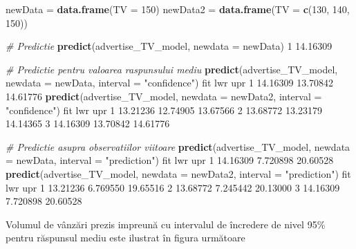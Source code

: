 \documentclass[]{article}
\newenvironment{Shaded}{\begin{snugshade}}{\end{snugshade}}
\newcommand{\KeywordTok}[1]{\textcolor[rgb]{0.13,0.29,0.53}{\textbf{#1}}}
\newcommand{\DataTypeTok}[1]{\textcolor[rgb]{0.13,0.29,0.53}{#1}}
\newcommand{\DecValTok}[1]{\textcolor[rgb]{0.00,0.00,0.81}{#1}}
\newcommand{\FloatTok}[1]{\textcolor[rgb]{0.00,0.00,0.81}{#1}}
\newcommand{\StringTok}[1]{\textcolor[rgb]{0.31,0.60,0.02}{#1}}
\newcommand{\CommentTok}[1]{\textcolor[rgb]{0.56,0.35,0.01}{\textit{#1}}}
\newcommand{\NormalTok}[1]{#1}
\begin{document}
\begin{Shaded}
\begin{Highlighting}[]
\NormalTok{newData =}\StringTok{ }\KeywordTok{data.frame}\NormalTok{(}\DataTypeTok{TV =} \DecValTok{150}\NormalTok{)}
\NormalTok{newData2 =}\StringTok{ }\KeywordTok{data.frame}\NormalTok{(}\DataTypeTok{TV =} \KeywordTok{c}\NormalTok{(}\DecValTok{130}\NormalTok{, }\DecValTok{140}\NormalTok{, }\DecValTok{150}\NormalTok{))}

\CommentTok{# Predictie}
\KeywordTok{predict}\NormalTok{(advertise_TV_model, }\DataTypeTok{newdata =}\NormalTok{ newData)}
       \DecValTok{1} 
\FloatTok{14.16309} 

\CommentTok{# Predictie pentru valoarea raspunsului mediu}
\KeywordTok{predict}\NormalTok{(advertise_TV_model, }\DataTypeTok{newdata =}\NormalTok{ newData, }\DataTypeTok{interval =} \StringTok{"confidence"}\NormalTok{)}
\NormalTok{       fit      lwr      upr}
\DecValTok{1} \FloatTok{14.16309} \FloatTok{13.70842} \FloatTok{14.61776}
\KeywordTok{predict}\NormalTok{(advertise_TV_model, }\DataTypeTok{newdata =}\NormalTok{ newData2, }\DataTypeTok{interval =} \StringTok{"confidence"}\NormalTok{)}
\NormalTok{       fit      lwr      upr}
\DecValTok{1} \FloatTok{13.21236} \FloatTok{12.74905} \FloatTok{13.67566}
\DecValTok{2} \FloatTok{13.68772} \FloatTok{13.23179} \FloatTok{14.14365}
\DecValTok{3} \FloatTok{14.16309} \FloatTok{13.70842} \FloatTok{14.61776}

\CommentTok{# Predictie asupra observatiilor viitoare}
\KeywordTok{predict}\NormalTok{(advertise_TV_model, }\DataTypeTok{newdata =}\NormalTok{ newData, }\DataTypeTok{interval =} \StringTok{"prediction"}\NormalTok{)}
\NormalTok{       fit      lwr      upr}
\DecValTok{1} \FloatTok{14.16309} \FloatTok{7.720898} \FloatTok{20.60528}
\KeywordTok{predict}\NormalTok{(advertise_TV_model, }\DataTypeTok{newdata =}\NormalTok{ newData2, }\DataTypeTok{interval =} \StringTok{"prediction"}\NormalTok{)}
\NormalTok{       fit      lwr      upr}
\DecValTok{1} \FloatTok{13.21236} \FloatTok{6.769550} \FloatTok{19.65516}
\DecValTok{2} \FloatTok{13.68772} \FloatTok{7.245442} \FloatTok{20.13000}
\DecValTok{3} \FloatTok{14.16309} \FloatTok{7.720898} \FloatTok{20.60528}
\end{Highlighting}
\end{Shaded}

Volumul de vânzări prezis impreună cu intervalul de încredere de nivel
95\% pentru răspunsul mediu este ilustrat în figura următoare
\end{document}
